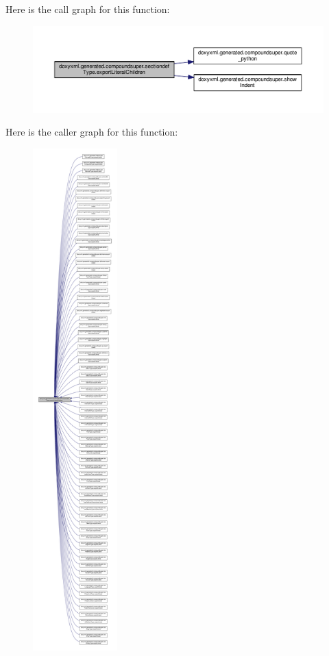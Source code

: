 Here is the call graph for this function\+:
\nopagebreak
\begin{figure}[H]
\begin{center}
\leavevmode
\includegraphics[width=350pt]{d6/d3f/classdoxyxml_1_1generated_1_1compoundsuper_1_1sectiondefType_a4870e7089e77c238dee4e0640ca1841f_cgraph}
\end{center}
\end{figure}




Here is the caller graph for this function\+:
\nopagebreak
\begin{figure}[H]
\begin{center}
\leavevmode
\includegraphics[height=550pt]{d6/d3f/classdoxyxml_1_1generated_1_1compoundsuper_1_1sectiondefType_a4870e7089e77c238dee4e0640ca1841f_icgraph}
\end{center}
\end{figure}


